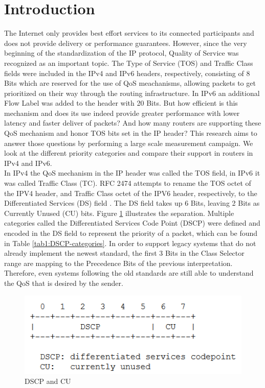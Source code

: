 \documentclass[conference]{IEEEtran}
\begin{document}
\section{Introduction}
The Internet only provides best effort services to its connected participants and does not provide delivery or performance guarantees. However, since the very beginning of the standardization of the IP protocol, Quality of Service was recognized as an important topic. The Type of Service (TOS) and Traffic Class fields were included in the IPv4 and IPv6 headers, respectively,  consisting of 8 Bits which are reserved for the use of QoS meachanisms, allowing packets to get prioritized on their way through the routing infrastructure. In IPv6 an additional Flow Label was added to the header with 20 Bits. But how efficient is this mechanism and does its use indeed provide greater performance with lower latency and faster deliver of packets? And how many routers are supporting these QoS mechanism and honor TOS bits set in the IP header? This research aims to answer those questions by performing a large scale measurement campaign. We look at the different priority categories and compare their support in routers in IPv4 and IPv6. \\

In IPv4 the QoS mechanism in the IP header was called the TOS field, in IPv6 it was called Traffic Class (TC). RFC 2474 attempts to rename the TOS octet of the IPV4 header, and Traffic Class octet of the IPV6 header, respectively, to the Differentiated Services (DS) field \cite{b1}. The DS field takes up 6 Bits, leaving 2 Bits as Currently Unused (CU) bits. Figure \ref{fig:QoS-value} illustrates the separation. Multiple categories called the Differentiated Services Code Point (DSCP) were defined and encoded in the DS field to represent the priority of a packet, which can be found in Table \ref{tab1:DSCP-categories}. In order to support legacy systems that do not already implement the newest standard, the first 3 Bits in the Class Selector range are mapping to the Precedence Bits of the previous interpretation. Therefore, even systems following the old standards are still able to understand the QoS that is desired by the sender. \\



\begin{figure}
\centerline{\includegraphics{figures/QoS_field.png}}
\caption{DSCP and CU}
\label{fig:QoS-value}
\end{figure}
\end{document}
